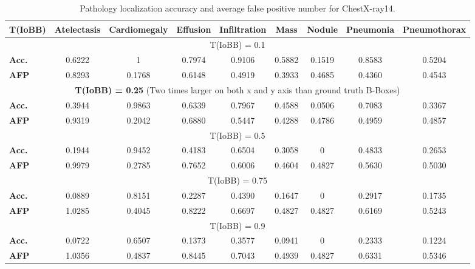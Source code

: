 \documentclass[10pt,twocolumn,letterpaper]{article}
\begin{document}
\begin{table}[t]
	\small
	\centering
	\begin{tabular}{|p{6.5em}||c|c|c|c|c|c|c|c|}
		\hline
		{\bf T(IoBB)}   & {\bf Atelectasis} & {\bf Cardiomegaly} & {\bf Effusion} & {\bf Infiltration} & {\bf Mass} & {\bf Nodule} & {\bf Pneumonia} & {\bf Pneumothorax} \\
		\hline\hline
		\multicolumn{9}{|c|}{T(IoBB) = 0.1}\\
		\hline
		{\bf Acc.}   & 0.6222& 1&	0.7974&0.9106&0.5882&0.1519&0.8583&0.5204\\
		\hline
		{\bf AFP}    & 0.8293&0.1768&0.6148&0.4919&0.3933&0.4685&0.4360&0.4543\\
		\hline
		\multicolumn{9}{|c|}{\textbf{T(IoBB) = 0.25} (Two times larger on both x and y axis than ground truth B-Boxes)}\\
		\hline
		{\bf Acc.}   & 0.3944&0.9863&0.6339&0.7967&0.4588&0.0506&0.7083&0.3367\\
		\hline
		{\bf AFP}   & 0.9319&0.2042&0.6880&0.5447&0.4288&0.4786&0.4959&0.4857\\
		\hline
		\multicolumn{9}{|c|}{T(IoBB) = 0.5}\\
		\hline
		{\bf Acc.}   & 0.1944&0.9452&0.4183&0.6504&0.3058&0&0.4833&0.2653\\
		\hline
		{\bf AFP}   &0.9979&0.2785&0.7652&0.6006&0.4604&0.4827&0.5630&0.5030\\
		\hline
		\multicolumn{9}{|c|}{T(IoBB) = 0.75}\\
		\hline		
		{\bf Acc.}   & 0.0889&0.8151&0.2287&0.4390&0.1647&0&0.2917&0.1735\\
		\hline
		{\bf AFP}   & 1.0285&0.4045&0.8222&0.6697&0.4827&0.4827&0.6169&0.5243\\
		\hline
		\multicolumn{9}{|c|}{T(IoBB) = 0.9} \\
		\hline
		{\bf Acc.}   &0.0722&0.6507&0.1373&0.3577&0.0941&0&0.2333&0.1224\\
		\hline
		{\bf AFP}   & 1.0356&0.4837&0.8445&0.7043&0.4939&0.4827&0.6331&0.5346\\
		\hline
	\end{tabular}\label{tab:IoBB_14}
	\caption{Pathology localization accuracy and average false positive number for ChestX-ray14.}
\end{table}
\end{document}
